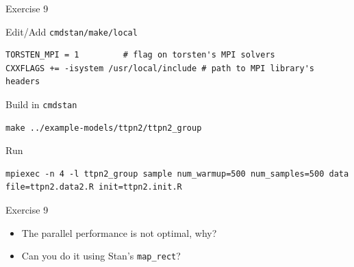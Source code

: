 \documentclass[presentation, allowframebreaks]{beamer}
\begin{document}
\begin{frame}[fragile,label={sec:org0b9039b}]{Exercise 9}
 \begin{block}{Edit/Add \texttt{cmdstan/make/local}}
\begin{verbatim}
TORSTEN_MPI = 1         # flag on torsten's MPI solvers
CXXFLAGS += -isystem /usr/local/include # path to MPI library's headers
\end{verbatim}
\end{block}
\begin{block}{Build in \texttt{cmdstan}}
\begin{verbatim}
make ../example-models/ttpn2/ttpn2_group
\end{verbatim}
\end{block}
\begin{block}{Run}
\begin{verbatim}
mpiexec -n 4 -l ttpn2_group sample num_warmup=500 num_samples=500 data file=ttpn2.data2.R init=ttpn2.init.R
\end{verbatim}
\end{block}
\end{frame}

\begin{frame}[fragile,label={sec:orgf252be1}]{Exercise 9}
 \begin{itemize}
\item The parallel performance is not optimal, why?
\item Can you do it using Stan's \texttt{map\_rect}?
\end{itemize}
\end{frame}
\end{document}
